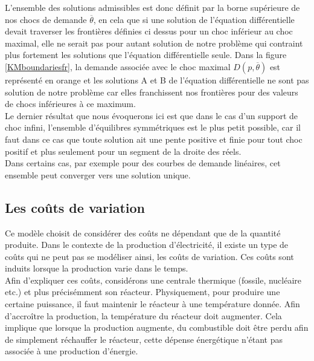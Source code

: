 L'ensemble des solutions admissibles est donc définit par la borne supérieure de nos chocs de demande $\overline{\theta}$, en cela que si une solution de l'équation différentielle devait traverser les frontières définies ci dessus pour un choc inférieur au choc maximal, elle ne serait pas pour autant solution de notre problème qui contraint plus fortement les solutions que l'équation différentielle seule. Dans la figure \ref{KMboundariesfr}, la demande associée avec le choc maximal $D(p,\overline{\theta})$ est représenté en orange et les solutions A et B de l'équation différentielle ne sont pas solution de notre problème car elles franchissent nos frontières pour des valeurs de chocs inférieures à ce maximum.\\

Le dernier résultat que nous évoquerons ici est que dans le cas d'un support de choc infini, l'ensemble d'équilibres symmétriques est le plus petit possible, car il faut dans ce cas que toute solution ait une pente positive et finie pour tout choc positif et plus seulement pour un segment de la droite des réels.\\

Dans certains cas, par exemple pour des courbes de demande linéaires, cet ensemble peut converger vers une solution unique.\\

\subsection*{Les coûts de variation}

Ce modèle choisit de considérer des coûts ne dépendant que de la quantité produite. Dans le contexte de la production d'électricité, il existe un type de coûts qui ne peut pas se modéliser ainsi, les coûts de variation. Ces coûts sont induits lorsque la production varie dans le temps.\\

Afin d'expliquer ces coûts, considérons une centrale thermique (fossile, nucléaire etc.) et plus précisémment son réacteur. Physiquement, pour produire une certaine puissance, il faut maintenir le réacteur à une température donnée. Afin d'accroître la production, la température du réacteur doit augmenter. Cela implique que lorsque la production augmente, du combustible doit être perdu afin de simplement réchauffer le réacteur, cette dépense énergétique n'étant pas associée à une production d'énergie. \\

